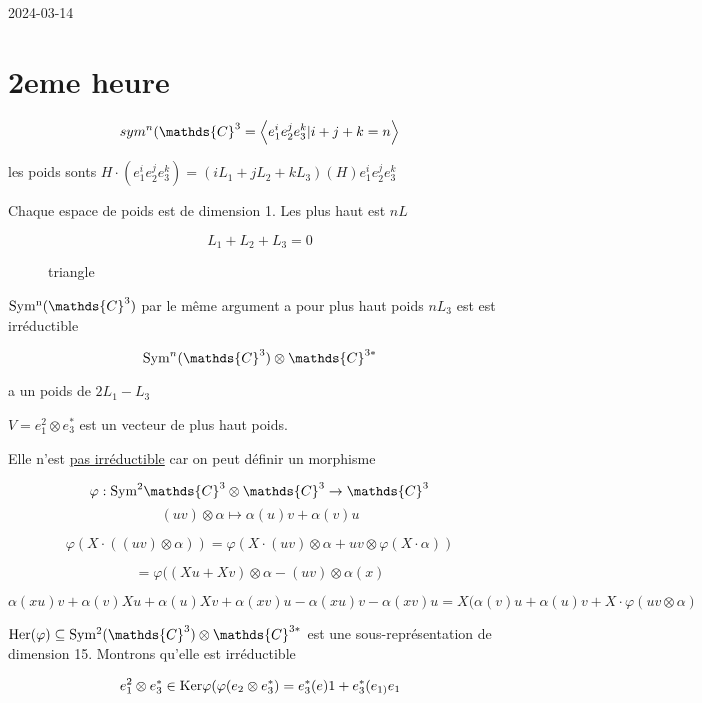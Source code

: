 


2024-03-14


\section*{2eme heure}


\[ sym^{n}(\mathds{C}^{3} = \expval{e_1^{i}e_2^{j} e_3^{k} | i+j+k = n} \]

les poids sonts \(H \cdot \left( e_1^{i} e_2^{j} e_3^{k} \right) = (iL_1 +j L_2 + k L_3 ) (H) e_1^{i} e_2^{j} e_3^{k} \)

Chaque espace de poids est de dimension 1. Les plus haut est \(nL\)

\[ L_1 + L_2 +L_3 = 0 \]

\begin{figure}[ht]
    \centering
    \caption{triangle}
    \label{fig:triangle}
\end{figure}


\( {\rm{}Sym^n}(\mathds{C}^{3})  \) par le même argument a pour plus haut poids \(nL_3\) est est irréductible 

\[ {\rm{}Sym}^n (\mathds{C}^{3}) \otimes \mathds{C}^{3*} \]

a un poids de \(2L_1 - L_3 \)

\(V = e_1^{2} \otimes e_3 ^{*}\) est un vecteur de plus haut poids.

Elle n'est \underline{pas irréductible} car on peut définir un morphisme 

\[ \varphi: {\rm{}Sym}^2 \mathds{C}^3 \otimes \mathds{C}^{3} \to \mathds{C}^{3} \]
\[ (uv) \otimes \alpha \mapsto \alpha(u)v + \alpha(v) u \]

\[ \varphi(X \cdot  ((uv) \otimes \alpha)) = \varphi(X \cdot (uv) \otimes \alpha + uv \otimes\varphi(X \cdot \alpha)) \]

\[ = \varphi((X u + Xv) \otimes\alpha -(uv) \otimes \alpha(x) \]

\[ \alpha(xu)v +\alpha(v)Xu + \alpha(u) Xv + \alpha(xv)u - \alpha(xu)v -\alpha(xv) u = X(\alpha(v) u + \alpha(u)v + X \cdot \varphi (uv \otimes \alpha) \]

\({\rm{}Her}(\varphi) \subseteq {\rm{}Sym^{2}}(\mathds{C}^{3}) \otimes \mathds{C}^{3*} \) est une sous-représentation de dimension 15. Montrons qu'elle est irréductible 


\[ e_1^{2} \otimes e_3^{*} \in {\rm{}Ker} \varphi ( \varphi (e_2 \otimes e_3 ^{*}) = e_3 ^{*} (e)1 + e_3^{*} (e_{1)} e_1 \]


